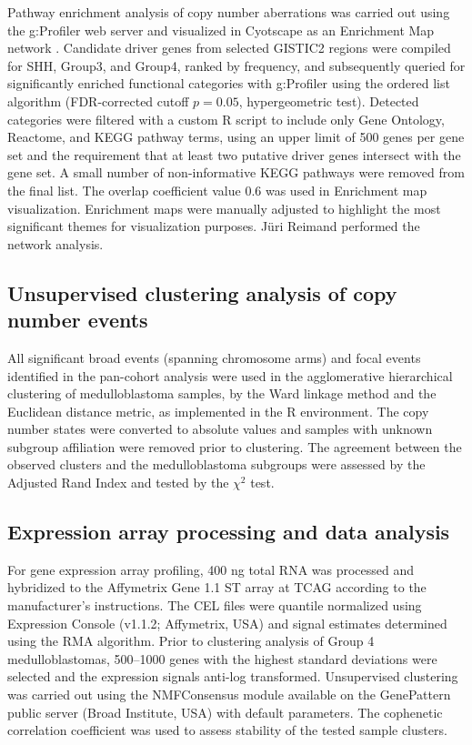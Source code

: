 Pathway enrichment analysis of copy number aberrations was carried out using the g:Profiler web server  and visualized in Cyotscape as an Enrichment Map network . Candidate driver genes from selected GISTIC2 regions were compiled for SHH, Group3, and Group4, ranked by frequency, and subsequently queried for significantly enriched functional categories with g:Profiler using the ordered list algorithm (FDR-corrected cutoff $p=0.05$, hypergeometric test). Detected categories were filtered with a custom R script to include only Gene Ontology, Reactome, and KEGG pathway terms, using an upper limit of 500 genes per gene set and the requirement that at least two putative driver genes intersect with the gene set. A small number of non-informative KEGG pathways were removed from the final list. The overlap coefficient value 0.6 was used in Enrichment map visualization.  Enrichment maps were manually adjusted to highlight the most significant themes for visualization purposes.  J\"{u}ri Reimand performed the network analysis.

\subsection{Unsupervised clustering analysis of copy number events}

All significant broad events (spanning chromosome arms) and focal events identified in the pan-cohort analysis were used in the agglomerative hierarchical clustering of medulloblastoma samples, by the Ward linkage method and the Euclidean distance metric, as implemented in the R environment. The copy number states were converted to absolute values and samples with unknown subgroup affiliation were removed prior to clustering. The agreement between the observed clusters and the medulloblastoma subgroups were assessed by the Adjusted Rand Index and tested by the $\chi^2$ test.

\subsection{Expression array processing and data analysis}

For gene expression array profiling, 400 ng total RNA was processed and hybridized to the Affymetrix Gene 1.1 ST array at TCAG according to the manufacturer’s instructions. The CEL files were quantile normalized using Expression Console (v1.1.2; Affymetrix, USA) and signal estimates determined using the RMA algorithm.  Prior to clustering analysis of Group 4 medulloblastomas, 500--1000 genes with the highest standard deviations were selected and the expression signals anti-log transformed. Unsupervised clustering was carried out using the NMFConsensus module available on the GenePattern public server (Broad Institute, USA) with default parameters. The cophenetic correlation coefficient was used to assess stability of the tested sample clusters.

